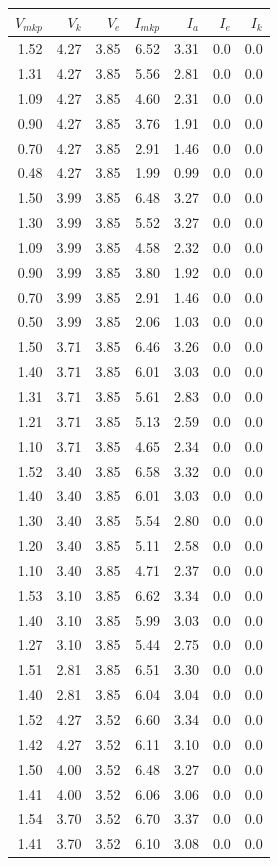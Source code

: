 \documentclass[a4paper,12pt]{article}
\theoremstyle{plain} %
\theoremstyle{definition} %
\theoremstyle{remark} %
\begin{document}
\begin{tabular}{rrrrrrr}
\toprule
 $V_{mkp}$ & $V_{k}$ & $V_{e}$ & $I_{mkp}$ & $I_{a}$ & $I_{e}$ & $I_k$ \\
\midrule
 1.52 & 4.27 & 3.85 & 6.52 & 3.31 & 0.0 & 0.0 \\
 1.31 & 4.27 & 3.85 & 5.56 & 2.81 & 0.0 & 0.0 \\
 1.09 & 4.27 & 3.85 & 4.60 & 2.31 & 0.0 & 0.0 \\
 0.90 & 4.27 & 3.85 & 3.76 & 1.91 & 0.0 & 0.0 \\
 0.70 & 4.27 & 3.85 & 2.91 & 1.46 & 0.0 & 0.0 \\
 0.48 & 4.27 & 3.85 & 1.99 & 0.99 & 0.0 & 0.0 \\
 1.50 & 3.99 & 3.85 & 6.48 & 3.27 & 0.0 & 0.0 \\
 1.30 & 3.99 & 3.85 & 5.52 & 3.27 & 0.0 & 0.0 \\
 1.09 & 3.99 & 3.85 & 4.58 & 2.32 & 0.0 & 0.0 \\
 0.90 & 3.99 & 3.85 & 3.80 & 1.92 & 0.0 & 0.0 \\
 0.70 & 3.99 & 3.85 & 2.91 & 1.46 & 0.0 & 0.0 \\
 0.50 & 3.99 & 3.85 & 2.06 & 1.03 & 0.0 & 0.0 \\
 1.50 & 3.71 & 3.85 & 6.46 & 3.26 & 0.0 & 0.0 \\
 1.40 & 3.71 & 3.85 & 6.01 & 3.03 & 0.0 & 0.0 \\
 1.31 & 3.71 & 3.85 & 5.61 & 2.83 & 0.0 & 0.0 \\
 1.21 & 3.71 & 3.85 & 5.13 & 2.59 & 0.0 & 0.0 \\
 1.10 & 3.71 & 3.85 & 4.65 & 2.34 & 0.0 & 0.0 \\
 1.52 & 3.40 & 3.85 & 6.58 & 3.32 & 0.0 & 0.0 \\
 1.40 & 3.40 & 3.85 & 6.01 & 3.03 & 0.0 & 0.0 \\
 1.30 & 3.40 & 3.85 & 5.54 & 2.80 & 0.0 & 0.0 \\
 1.20 & 3.40 & 3.85 & 5.11 & 2.58 & 0.0 & 0.0 \\
 1.10 & 3.40 & 3.85 & 4.71 & 2.37 & 0.0 & 0.0 \\
 1.53 & 3.10 & 3.85 & 6.62 & 3.34 & 0.0 & 0.0 \\
 1.40 & 3.10 & 3.85 & 5.99 & 3.03 & 0.0 & 0.0 \\
 1.27 & 3.10 & 3.85 & 5.44 & 2.75 & 0.0 & 0.0 \\
 1.51 & 2.81 & 3.85 & 6.51 & 3.30 & 0.0 & 0.0 \\
 1.40 & 2.81 & 3.85 & 6.04 & 3.04 & 0.0 & 0.0 \\
 1.52 & 4.27 & 3.52 & 6.60 & 3.34 & 0.0 & 0.0 \\
 1.42 & 4.27 & 3.52 & 6.11 & 3.10 & 0.0 & 0.0 \\
 1.50 & 4.00 & 3.52 & 6.48 & 3.27 & 0.0 & 0.0 \\
 1.41 & 4.00 & 3.52 & 6.06 & 3.06 & 0.0 & 0.0 \\
 1.54 & 3.70 & 3.52 & 6.70 & 3.37 & 0.0 & 0.0 \\
 1.41 & 3.70 & 3.52 & 6.10 & 3.08 & 0.0 & 0.0 \\
\bottomrule
\end{tabular}
	
\end{document}
